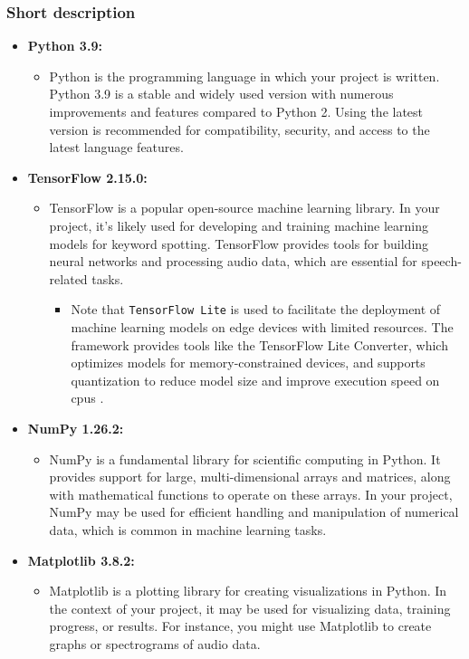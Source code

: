 \subsubsection{Short description}

\begin{itemize}
	\item \textbf{Python 3.9:}
	\begin{itemize}
		\item Python is the programming language in which your project is written. Python 3.9 is a stable and widely used version with numerous improvements and features compared to Python 2. Using the latest version is recommended for compatibility, security, and access to the latest language features.
	\end{itemize}
	
	\item \textbf{TensorFlow 2.15.0:}
	\begin{itemize}
		\item TensorFlow is a popular open-source machine learning library. In your project, it's likely used for developing and training machine learning models for keyword spotting. TensorFlow provides tools for building neural networks and processing audio data, which are essential for speech-related tasks.
		\begin{itemize}
			\item Note that \texttt{TensorFlow Lite} is used to facilitate the deployment of machine learning models on edge devices with limited resources. The framework provides tools like the TensorFlow Lite Converter, which optimizes models for memory-constrained devices, and supports quantization to reduce model size and improve execution speed on \ac{cpu}s \cite{Warden:2019}.
		\end{itemize}
	\end{itemize}
	
	\item \textbf{NumPy 1.26.2:}
	\begin{itemize}
		\item NumPy is a fundamental library for scientific computing in Python. It provides support for large, multi-dimensional arrays and matrices, along with mathematical functions to operate on these arrays. In your project, NumPy may be used for efficient handling and manipulation of numerical data, which is common in machine learning tasks.
	\end{itemize}
	
	\item \textbf{Matplotlib 3.8.2:}
	\begin{itemize}
		\item Matplotlib is a plotting library for creating visualizations in Python. In the context of your project, it may be used for visualizing data, training progress, or results. For instance, you might use Matplotlib to create graphs or spectrograms of audio data.
	\end{itemize}
	

\end{itemize}
